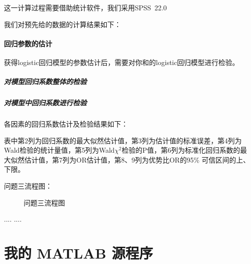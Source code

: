 \documentclass[bwprint]{cumcmthesis}
\begin{document}
这一计算过程需要借助统计软件，我们采用SPSS~22.0

我们对预先给的数据的计算结果如下：

\paragraph{回归参数的估计}
获得logistic回归模型的参数估计后，需要对你和的logistic回归模型进行检验。
\subparagraph{对模型回归系数整体的检验}
\subparagraph{对模型中回归系数进行检验}
各因素的回归系数估计及检验结果如下：

表中第2列为回归系数的最大似然估计值，第3列为估计值的标准误差，第4列为Wald检验的统计量值，第5列为Wald$ \chi^{2} $检验的P值，第6列为标准化回归系数的最大似然估计值，第7列为OR估计值，第8、9列为优势比OR的95\% 可信区间的上、下限。

问题三流程图：
\begin{figure}[!h]
\centering
\caption{问题三流程图}
\end{figure}
\begin{thebibliography}{9}
  ....
  ....
\end{thebibliography}
\appendix
\section{我的 MATLAB 源程序}
\end{document}

